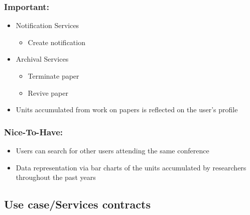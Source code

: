 \documentclass[11pt]{article}
\begin{document}
	\subsubsection{Important:}
	\begin{itemize}
		\item Notification Services
		\begin{itemize}
			\item Create notification
		\end{itemize}
		\item Archival Services
		\begin{itemize}
			\item Terminate paper
			\item Revive paper
		\end{itemize}
	\end{itemize}
	\begin{itemize}
		\item Units accumulated from work on papers is reflected on the user's profile
	\end{itemize}
	
	\subsubsection{Nice-To-Have:}
	\begin{itemize}
		\item Users can search for other users attending the same conference
		\item Data representation via bar charts of the units accumulated by researchers throughout the past years
	\end{itemize}
	
	\newpage
	
	\subsection{Use case/Services contracts}
\end{document}
